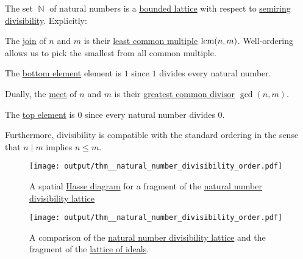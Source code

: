 \begin{proposition}\label{thm:natural_number_divisibility_order}
  The set \hyperref[def:set_of_natural_numbers]{\( \BbbN \)} of natural numbers is a \hyperref[def:semilattice/bounded]{bounded lattice} with respect to \hyperref[def:divisibility]{semiring divisibility}. Explicitly:
  \begin{thmenum}
     The \hyperref[def:semilattice/join]{join} of \( n \) and \( m \) is their \hyperref[def:gcd_and_lcm]{least common multiple} \( \operatorname{lcm}(n, m) \). Well-ordering allows us to pick the smallest from all common multiple.

     The \hyperref[def:partially_ordered_set_extremal_points/top_and_bottom]{bottom element} element is \( 1 \) since \( 1 \) divides every natural number.

     Dually, the \hyperref[def:semilattice/meet]{meet} of \( n \) and \( m \) is their \hyperref[def:gcd_and_lcm]{greatest common divisor} \( \gcd(n, m) \).

     The \hyperref[def:partially_ordered_set_extremal_points/top_and_bottom]{top element} is \( 0 \) since every natural number divides \( 0 \).
  \end{thmenum}

  Furthermore, divisibility is compatible with the standard ordering in the sense that \( n \mid m \) implies \( n \leq m \).

  \begin{figure}
    \centering
    \texttt{[image: output/thm\_\_natural\_number\_divisibility\_order.pdf]}
    \caption{A spatial \hyperref[def:hasse_diagram]{Hasse diagram} for a fragment of the \hyperref[thm:natural_number_divisibility_order]{natural number divisibility lattice}}
    \label{fig:thm:natural_number_divisibility_order/divisibility}
  \end{figure}

  \begin{figure}
    \centering
    \texttt{[image: output/thm\_\_natural\_number\_divisibility\_order.pdf]}
    \caption{A comparison of the \hyperref[thm:natural_number_divisibility_order]{natural number divisibility lattice} and the fragment of the \hyperref[thm:semiring_of_ideals/lattice]{lattice of ideals}.}
    \label{fig:thm:natural_number_divisibility_order/ideals}
  \end{figure}
\end{proposition}
